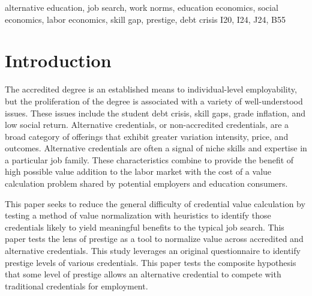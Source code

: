 \documentclass[review]{elsarticle}
\begin{document}
\begin{frontmatter}
    \begin{keyword}
        alternative education, job search, work norms, education economics, social economics, labor economics, skill gap, prestige, debt crisis    %
        \MSC[2010] I20, I24, J24, B55                                                                     %
    \end{keyword}

\end{frontmatter}

\pagebreak
\linenumbers

\section{Introduction}

The accredited degree is an established means to individual-level employability, but the proliferation of the degree is associated with a variety of well-understood issues.
These issues include the student debt crisis, skill gaps, grade inflation, and low social return.
Alternative credentials, or non-accredited credentials, are a broad category of offerings that exhibit greater variation intensity, price, and outcomes\cite{urdan_2020}.
Alternative credentials are often a signal of niche skills and expertise in a particular job family.
These characteristics combine to provide the benefit of high possible value addition to the labor market
with the cost of a value calculation problem shared by potential employers and education consumers.

This paper seeks to reduce the general difficulty of credential value calculation by testing a method of value normalization
with heuristics to identify those credentials likely to yield meaningful benefits to the typical job search.
This paper tests the lens of prestige as a tool to normalize value across accredited and alternative credentials.
This study leverages an original questionnaire to identify prestige levels of various credentials.
This paper tests the composite hypothesis that some level of prestige allows an alternative credential to compete with traditional credentials for employment.
\end{document}
